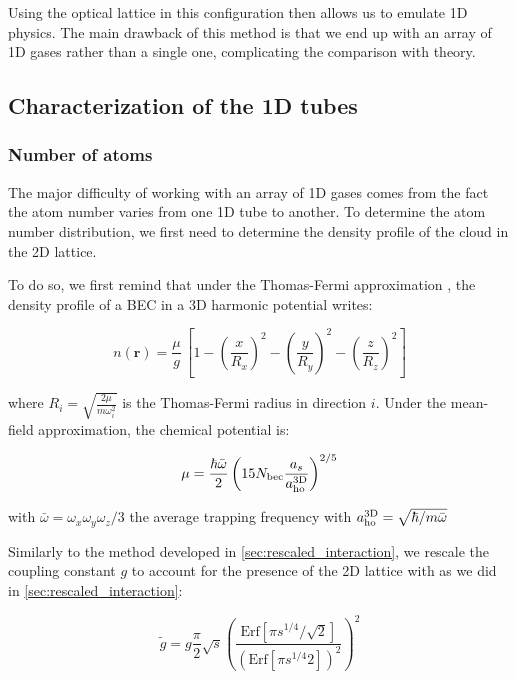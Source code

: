 Using the optical lattice in this configuration then allows us to emulate 1D physics. The main drawback of this method is that we end up with an array of 1D gases rather than a single one, complicating the comparison with theory.


\subsection{Characterization of the 1D tubes}

\subsubsection{Number of atoms}

The major difficulty of working with an array of 1D gases comes from the fact the atom number varies from one 1D tube to another. To determine the atom number distribution, we first need to determine the density profile of the cloud in the 2D lattice.

To do so, we first remind that under the Thomas-Fermi approximation \cite{pethick2008bose}, the density profile of a BEC in a 3D harmonic potential writes:

\begin{equation}
     n(\bm{r}) = \frac{\mu}{g} \, \left[ 1 - \left( \frac{x}{R_x} \right)^2 - \left( \frac{y}{R_y} \right)^2 - \left( \frac{z}{R_z} \right)^2 \right]
\end{equation}

\noindent where $R_i = \sqrt{\frac{2 \mu}{m \omega_i^2}}$ is the Thomas-Fermi radius in direction $i$. Under the mean-field approximation, the chemical potential is:

\begin{equation}
     \mu = \frac{\hbar \bar{\omega}}{2} \left(  15 N_{\rm{bec}} \frac{a_s}{a^{\rm{3D}}_{\rm{ho}}}\right)^{2/5}
\end{equation}

\noindent with $\bar{\omega}=\omega_x \omega_y \omega_z/3$ the average trapping frequency with $a^{\rm{3D}}_{\rm{ho}}=\sqrt{\hbar/m \bar{\omega}}$

Similarly to the method developed in \ref{sec:rescaled_interaction}, we rescale the coupling constant $g$ to account for the presence of the 2D lattice with as we did in \ref{sec:rescaled_interaction}:

\begin{equation}
   \tilde{g} = g \frac{\pi}{2} \sqrt{s} \left( \frac{\textrm{Erf} [ \pi s^{1/4} / \sqrt{2}]}{(\textrm{Erf} [ \pi s^{1/4} 2])^2} \right)^2
\end{equation}

